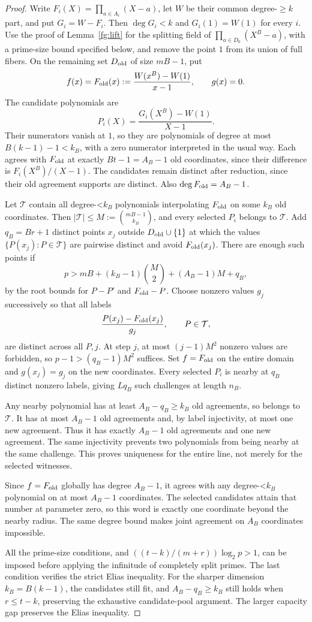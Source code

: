 \documentclass[11pt,letterpaper]{article}
\theoremstyle{definition}
\theoremstyle{remark}
\begin{document}
\begin{proof}
Write $F_i(X)=\prod_{a\in A_i}(X-a)$, let $W$ be their common
degree-$\ge k$ part, and put $G_i=W-F_i$. Then $\deg G_i<k$
and $G_i(1)=W(1)$ for every $i$.
Use the proof of Lemma~\ref{fg:lift} for the splitting field of
$\prod_{a\in D_0}(X^B-a)$, with a prime-size bound specified below,
and remove the point $1$ from its union of full fibers. On the
remaining set $D_{\rm old}$ of size $mB-1$, put
\[
 f(x)=F_{\rm old}(x):=\frac{W(x^B)-W(1)}{x-1},\qquad g(x)=0.
\]
The candidate polynomials are
\[
 P_i(X)=\frac{G_i(X^B)-W(1)}{X-1}.
\]
Their numerators vanish at $1$, so they are polynomials of degree
at most $B(k-1)-1<k_B$, with a zero numerator interpreted in the
usual way. Each agrees with $F_{\rm old}$ at exactly $Bt-1=A_B-1$
old coordinates, since their difference is $F_i(X^B)/(X-1)$.
The candidates remain distinct after reduction, since their old
agreement supports are distinct. Also $\deg F_{\rm old}=A_B-1$.

Let $\mathcal T$ contain all degree-<$k_B$ polynomials interpolating
$F_{\rm old}$ on some $k_B$ old coordinates. Then
$|\mathcal T|\le M:=\binom{mB-1}{k_B}$, and every selected $P_i$
belongs to $\mathcal T$. Add $q_B=Br+1$ distinct points $x_j$ outside
$D_{\rm old}\cup\{1\}$ at which the values
$\{P(x_j):P\in\mathcal T\}$ are pairwise distinct and avoid
$F_{\rm old}(x_j)$. There are enough such points if
\[
 p>mB+(k_B-1)\binom M2+(A_B-1)M+q_B,
\]
by the root bounds for $P-P'$ and $F_{\rm old}-P$.
Choose nonzero values $g_j$ successively so that all labels
\[
 \frac{P(x_j)-F_{\rm old}(x_j)}{g_j},\qquad P\in\mathcal T,
\]
are distinct across all $P,j$. At step $j$, at most $(j-1)M^2$
nonzero values are forbidden, so $p-1>(q_B-1)M^2$ suffices.
Set $f=F_{\rm old}$ on the entire domain and $g(x_j)=g_j$ on the
new coordinates. Every selected $P_i$ is nearby at $q_B$ distinct
nonzero labels, giving $Lq_B$ such challenges at length $n_B$.

Any nearby polynomial has at least $A_B-q_B\ge k_B$ old agreements,
so belongs to $\mathcal T$. It has at most $A_B-1$ old agreements
and, by label injectivity, at most one new agreement. Thus it has
exactly $A_B-1$ old agreements and one new agreement. The same
injectivity prevents two polynomials from being nearby at the same
challenge. This proves uniqueness for the entire line, not merely
for the selected witnesses.

Since $f=F_{\rm old}$ globally has degree $A_B-1$, it agrees with
any degree-<$k_B$ polynomial on at most $A_B-1$ coordinates. The
selected candidates attain that number at parameter zero, so this
word is exactly one coordinate beyond the nearby radius. The same
degree bound makes joint agreement on $A_B$ coordinates impossible.

All the prime-size conditions, and
$((t-k)/(m+r))\log_2p>1$, can be imposed before applying the
infinitude of completely split primes. The last condition verifies
the strict Elias inequality.
For the sharper dimension $k_B=B(k-1)$, the candidates still fit,
and $A_B-q_B\ge k_B$ still holds when $r\le t-k$, preserving
the exhaustive candidate-pool argument. The larger capacity gap preserves the
Elias inequality.
\end{proof}
\end{document}
